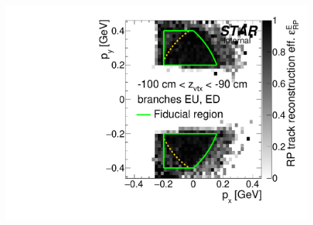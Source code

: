 \begin{figure}[hb]
{  \includegraphics[width=\linewidth,page=28]{graphics/corrections/mcFullEffPxPy.pdf}
}%
\end{figure}%
